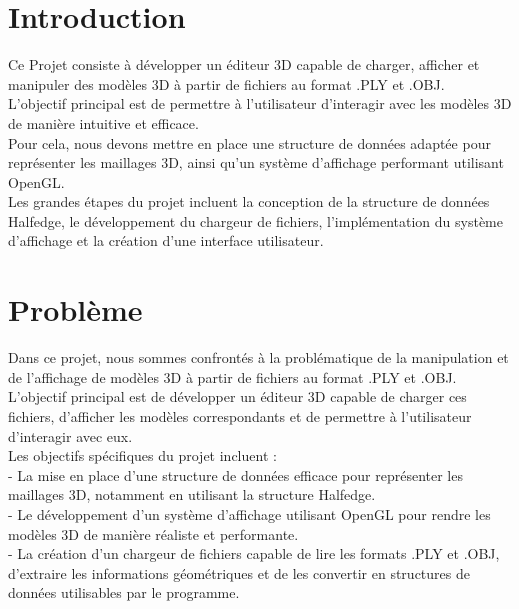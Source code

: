 \documentclass[12pt,a4paper]{article}
\begin{document}

\tableofcontents

\newpage


\section{Introduction}

Ce Projet consiste à développer un éditeur 3D capable de charger, afficher et manipuler des modèles 3D à partir de fichiers au format .PLY et .OBJ.\\
L'objectif principal est de permettre à l'utilisateur d'interagir avec les modèles 3D de manière intuitive et efficace.\\
Pour cela, nous devons mettre en place une structure de données adaptée pour représenter les maillages 3D, ainsi qu'un système d'affichage performant utilisant OpenGL.\\
Les grandes étapes du projet incluent la conception de la structure de données Halfedge, le développement du chargeur de fichiers, l'implémentation du système d'affichage et la création d'une interface utilisateur.\\

\vspace{4cm}

\section{Problème}

Dans ce projet, nous sommes confrontés à la problématique de la manipulation et de l'affichage de modèles 3D à partir de fichiers au format .PLY et .OBJ. L'objectif principal est de développer un éditeur 3D capable de charger ces fichiers, d'afficher les modèles correspondants et de permettre à l'utilisateur d'interagir avec eux.\\
Les objectifs spécifiques du projet incluent :\\
    - La mise en place d'une structure de données efficace pour représenter les maillages 3D, notamment en utilisant la structure Halfedge.\\
    - Le développement d'un système d'affichage utilisant OpenGL pour rendre les modèles 3D de manière réaliste et performante.\\
    - La création d'un chargeur de fichiers capable de lire les formats .PLY et .OBJ, d'extraire les informations géométriques et de les convertir en structures de données utilisables par le programme.\\
\end{document}
